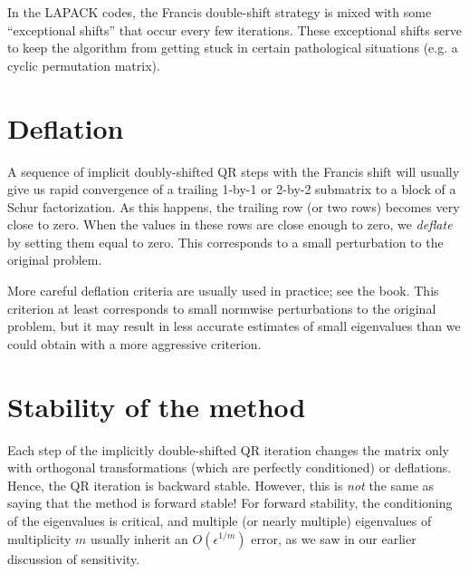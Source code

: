 \documentclass[12pt, leqno]{article} %
\begin{document}
%

In the LAPACK codes, the Francis double-shift strategy is mixed with
some ``exceptional shifts'' that occur every few iterations.
These exceptional shifts serve to keep the algorithm from getting
stuck in certain pathological situations (e.g. a cyclic permutation
matrix).

\section{Deflation}

A sequence of implicit doubly-shifted QR steps with the Francis shift
will usually give us rapid convergence of a trailing 1-by-1 or 2-by-2
submatrix to a block of a Schur factorization.  As this happens,
the trailing row (or two rows) becomes very close to zero.  When the
values in these rows are close enough to zero, we {\em deflate} by
setting them equal to zero.  This corresponds to a small perturbation
to the original problem.

%
%

More careful deflation criteria are usually used in practice;
see the book.  This criterion at least corresponds to small normwise
perturbations to the original problem, but it may result in less
accurate estimates of small eigenvalues than we could obtain with
a more aggressive criterion.

\section{Stability of the method}

Each step of the implicitly double-shifted QR iteration changes the
matrix only with orthogonal transformations (which are perfectly conditioned)
or deflations.  Hence, the QR iteration is backward stable.  However,
this is {\em not} the same as saying that the method is forward stable!
For forward stability, the conditioning of the eigenvalues is critical,
and multiple (or nearly multiple) eigenvalues of multiplicity $m$
usually inherit an $O(\epsilon^{1/m})$ error, as we saw in our earlier
discussion of sensitivity.
\end{document}
